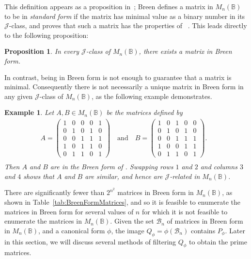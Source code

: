 \documentclass[11pt]{article}
\newtheorem{prop}[thm]{Proposition}
\newtheorem{exa}[thm]{Example}
\newenvironment{ex}{\begin{exa}\rm}{\end{exa}}
\numberwithin{equation}{section}
\newcommand{\B}{\mathbb{B}}
\newcommand{\Bn}{M_n(\B)}
\newcommand{\J}{\mathscr{J}}
\begin{document}
This definition appears as a proposition in~\cite{Breen1997aa}; Breen defines a
matrix in $\Bn$ to be in \emph{standard form} if the matrix has minimal value as
a binary number in its $\J$-class, and proves that such a matrix has the
properties of ~\cite[Proposition 3.6]{Breen1997aa}. This leads
directly to the following proposition:

\begin{prop}
  In every $\J$-class of $\Bn$, there exists a matrix in Breen form. 
\end{prop}

In contrast, being in Breen form is not enough to guarantee that a matrix is
minimal. Consequently there is not necessarily a unique matrix in Breen form
in any given $\J$-class of $\Bn$, as the following example demonstrates. 
\begin{ex}
Let $A, B \in \Bn$ be the matrices defined by
\begin{align*}
  A = \begin{pmatrix}
    1 & 0 & 0 & 0 & 1 \\
    0 & 1 & 0 & 1 & 0 \\
    0 & 0 & 1 & 1 & 1 \\
    1 & 0 & 1 & 1 & 0 \\
    0 & 1 & 1 & 0 & 1 
  \end{pmatrix}\quad \text{and} \quad
  B = \begin{pmatrix}
    1 & 0 & 1 & 0 & 0 \\
    0 & 1 & 0 & 1 & 0 \\
    0 & 0 & 1 & 1 & 1 \\
    1 & 0 & 0 & 1 & 1 \\
    0 & 1 & 1 & 0 & 1 
  \end{pmatrix}.&\\
\end{align*}
Then $A$ and $B$ are in the Breen form of
. Swapping rows $1$ and $2$ and columns $3$
and $4$ shows that $A$ and $B$ are similar, and hence are $\J$-related in $\Bn$.
\end{ex}

There are significantly fewer than $2^{n^2}$ matrices in Breen form in $\Bn$,
as shown in Table~\ref{tab:BreenFormMatrices}, and so it is feasible to
enumerate the matrices in Breen form for several values of $n$ for which it
is not feasible to enumerate the matrices in $\Bn$.
Given the set $\mathcal{B}_n$ of matrices in Breen form in $\Bn$, and a canonical form
$\phi$, the image $Q_\phi = \phi(\mathcal{B}_n)$ contains $P_\phi$. Later in this section,
we will discuss several methods of filtering $Q_\phi$ to obtain the prime
matrices. 
\end{document}
